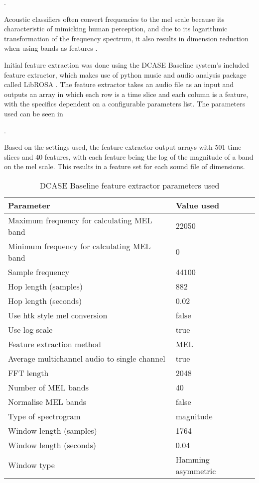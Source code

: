\documentclass[11pt]{article}
\begin{document}
\begin{multicols}{2}
. 

Acoustic classifiers often convert frequencies to the mel scale because its characteristic of mimicking human perception, and due to its logarithmic transformation of the frequency spectrum, it also results in dimension reduction when using bands as features \cite{Stowell2014}.


Initial feature extraction was done using the DCASE Baseline system’s included feature extractor, which makes use of python music and audio analysis package called LibROSA \cite{Heittola2017}. The feature extractor takes an audio file as an input and outputs an array in which each row is a time slice and each column is a feature, with the specifics dependent on a configurable parameters list. The parameters used can be seen in 

. 

Based on the settings used, the feature extractor output arrays with 501 time slices and 40 features, with each feature being the log of the magnitude of a band on the mel scale. This results in a feature set for each sound file of  dimensions.


\begin{table}
	\caption{DCASE Baseline feature extractor parameters used}
	\label{label}
	\begin{tabular}{|l|l|}
		\hline
		Parameter 						& Value used \\ \hline
		Maximum frequency for calculating MEL band	& 22050 \\
		Minimum frequency for calculating MEL band	& 0	\\		
		Sample frequency				& 44100\\
		Hop length (samples)			&	882\\
		Hop length (seconds)			& 0.02\\
		Use htk style mel conversion	& false\\
		Use log scale					& true\\
		Feature extraction method		& MEL\\
		Average multichannel audio to single channel & true\\
		FFT length						& 2048\\
		Number of MEL bands				& 40\\
		Normalise MEL bands				& false\\
		Type of spectrogram				& magnitude\\
		Window length (samples)			& 1764\\
		Window length (seconds)			& 0.04\\
		Window type						& Hamming asymmetric
	\end{tabular}
\end{table}



\end{multicols}
\end{document}
